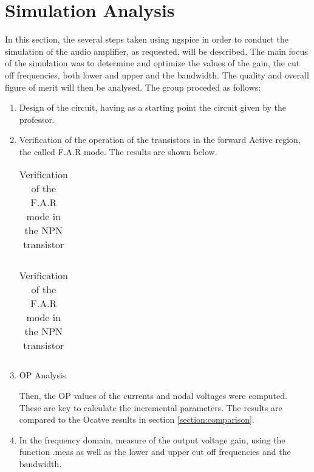 \section{Simulation Analysis}
\label{section:sim}
 
In this section, the several steps taken using ngspice in order to conduct the simulation of the audio amplifier, as requested, will be described. The main focus of the simulation was to determine and optimize the values of the gain, the cut off frequencies, both lower and upper and the bandwidth. The quality and overall figure of merit will then be analysed.
The group proceded as follows:

\begin{enumerate}
\item Design of the circuit, having as a starting point the circuit given by the professor.

\item Verification of the operation of the transistors in the forward Active region, the called F.A.R mode. The results are shown below.

\begin{table}[ht]
  \centering
  \begin{tabular}{|l|r|}
    \hline    
   
     \end{tabular}
  \caption{Verification of the F.A.R mode in the NPN transistor}
 
\end{table}


\begin{table}[ht]
  \centering
  \begin{tabular}{|l|r|}
    \hline    
   
     \end{tabular}
  \caption{Verification of the F.A.R mode in the NPN transistor}
    
\end{table}



\item OP Analysis
\par Then, the OP values of the currents and nodal voltages were computed. These are key to calculate the incremental parameters.
The results are compared to the Ocatve results in section \ref{section:comparison}.

  
\item  In the frequency domain, measure of the output voltage gain, using the function .meas as well as the lower and upper cut off frequencies and the bandwidth.



\end{enumerate}
